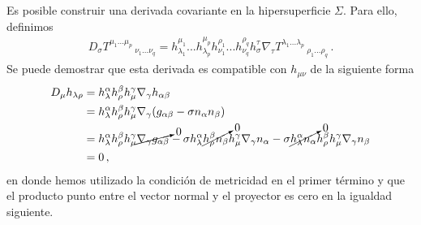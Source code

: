 \documentclass[../Main.tex]{subfiles}
\begin{document}
Es posible construir una derivada covariante en la hipersuperficie $\Sigma$. Para ello, definimos
\begin{align}
D_{\sigma}T^{\mu_{1}...\mu_{p}}\,_{\nu_{1}...\nu_{q}}=h^{\mu_{1}}_{\lambda_{1}}...h^{\mu_{p}}_{\lambda_{p}}h^{\rho_{1}}_{\nu_{1}}...h^{\rho_{q}}_{\nu_{q}}h^{\tau}_{\sigma}\nabla_{\tau}T^{\lambda_{1}...\lambda_{p}}\,_{\rho_{1}...\rho_{q}}\, .
\end{align}
Se puede demostrar que esta derivada es compatible con $h_{\mu\nu}$ de la siguiente forma
\begin{align}\notag
D_{\mu}h_{\lambda\rho}&=h^{\alpha}_{\lambda}h^{\beta}_{\rho}h^{\gamma}_{\mu}\nabla_{\gamma}h_{\alpha\beta}\\ \nonumber
&=h^{\alpha}_{\lambda}h^{\beta}_{\rho}h^{\gamma}_{\mu}\nabla_{\gamma}(g_{\alpha\beta}-\sigma n_{\alpha}n_{\beta})\\ \nonumber
&=h^{\alpha}_{\lambda}h^{\beta}_{\rho}h^{\gamma}_{\mu}\cancelto{0}{\nabla_{\gamma}g_{\alpha\beta}}-\sigma h^{\alpha}_{\lambda}\cancelto{0}{h^{\beta}_{\rho}n_{\beta}}h^{\gamma}_{\mu}\nabla_{\gamma}n_{\alpha}-\sigma \cancelto{0}{h^{\alpha}_{\lambda}n_{\alpha}}h^{\beta}_{\rho}h^{\gamma}_{\mu}\nabla_{\gamma}n_{\beta}\\ 
    &=0 \, ,
\end{align}
en donde hemos utilizado la condición de metricidad en el primer término y que el producto punto entre el vector normal y el proyector es cero en la igualdad siguiente.
\end{document}
